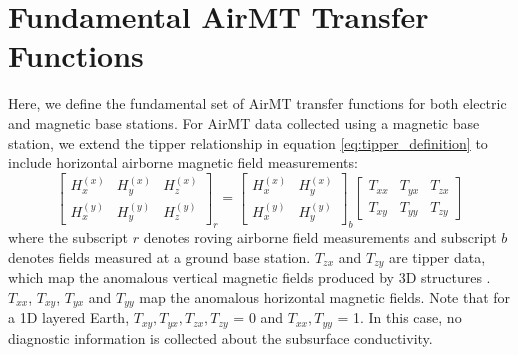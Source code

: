 \documentclass{segabs}
\begin{document}
\section{Fundamental AirMT Transfer Functions}
\vspace{-5pt}
Here, we define the fundamental set of AirMT transfer functions for both electric and magnetic base stations. For AirMT data collected using a magnetic base station, we extend the tipper relationship in equation \ref{eq:tipper_definition} to include horizontal airborne magnetic field measurements:
\begin{equation}
\label{eq:tipper_definition_ext}
\begin{bmatrix}\! H_x^{(x)} &\! H_y^{(x)} &\! H_z^{(x)} \\ \! H_x^{(y)} & \! H_y^{(y)} & \! H_z^{(y)} \end{bmatrix}_r \!\!\!\!\! = \!\!
\begin{bmatrix}\! H_x^{(x)} &\! H_y^{(x)} \\ \! H_x^{(y)} & \! H_y^{(y)} \end{bmatrix}_b \!
\begin{bmatrix}\! T_{xx} &\! T_{yx} & \! T_{zx} \\ \! T_{xy} & \! T_{yy} & \! T_{zy} \end{bmatrix}
\end{equation}
where the subscript $r$ denotes roving airborne field measurements and subscript $b$ denotes fields measured at a ground base station. $T_{zx}$ and $T_{zy}$ are tipper data, which map the anomalous vertical magnetic fields produced by 3D structures \citep{Vozoff1972}. $T_{xx}$, $T_{xy}$, $T_{yx}$ and $T_{yy}$ map the anomalous horizontal magnetic fields. Note that for a 1D layered Earth, $T_{xy}, T_{yx}, T_{zx}, T_{zy}$ = 0 and $T_{xx}, T_{yy}$ = 1. In this case, no diagnostic information is collected about the subsurface conductivity.
\end{document}

